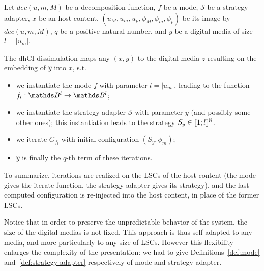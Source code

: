 \documentclass{comjnl}
\begin{document}
\begin{definition}
 \label{def:dhCI}
Let $\textit{dec}(u,m,M)$ be a decomposition function,
$f$ be a mode, 
$\mathcal{S}$ be a strategy adapter,
$x$ be an host content,\linebreak
$(u_M,u_m,u_p,\phi_{M},\phi_{m},\phi_{p})$ 
be its image by $\textit{dec}(u,m,M)$,
$q$ be a positive natural number,  
and $y$ be a digital media of size $l=|u_m|$.


The dhCI dissimulation  maps any
$(x,y)$  to the digital media $z$ resulting on the embedding of
$\hat{y}$ into $x$, s.t.

\begin{itemize}
\item we instantiate the mode $f$ with parameter $l=|u_m|$, leading to 
  the function $f_{l}:\Bool^{l} \rightarrow \Bool^{l}$;
\item we instantiate the strategy adapter $\mathcal{S}$ 
with parameter $y$ (and possibly some other ones);
this instantiation leads to the strategy $S_y \in \llbracket 1;l\rrbracket ^{\mathbb{N}}$.

\item we iterate $G_{f_l}$ with initial configuration $(S_y,\phi_{m})$;
\item $\hat{y}$ is finally the $q$-th term of these iterations.
\end{itemize}
\end{definition}


To summarize, iterations are realized on the LSCs of the
host content
(the mode gives the iterate function,  
the strategy-adapter gives its strategy), 
and the last computed configuration is re-injected into the host content, 
in place of the former LSCs.
























Notice that in order to preserve the unpredictable behavior of the system, 
the size of the digital medias is not fixed.
This approach is thus self adapted to any media, and more particularly to
any size of LSCs. 
However this flexibility enlarges the complexity of the presentation: 
we had to give Definitions~\ref{def:mode} and~\ref{def:strategy-adapter} 
respectively of mode and strategy adapter.
\end{document}
